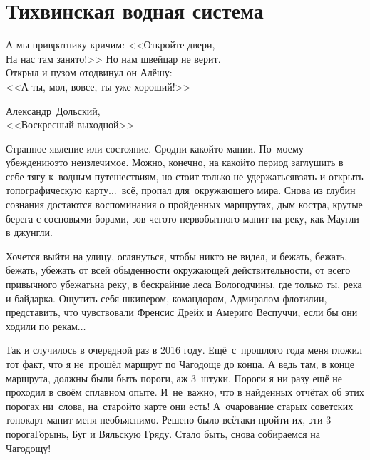 \chapter{Тихвинская водная система} 
\vspace{-9mm}
\vepsianrose

\setlength{\epigraphwidth}{0.75\textwidth}

\epigraph{%
	А мы привратнику кричим: <<Откройте двери,\\
	На нас там занято!>> Но нам швейцар не верит.\\
	Открыл и пузом отодвинул он Алёшу:\\
	<<А ты, мол, вовсе, ты уже хороший!>>}
	{
	\begin{flushright}
		\small{Александр~Дольский,\\<<Воскресный выходной>>}
	\end{flushright}
	}

Странное явление или состояние. Сродни какой\sdash то мании. По~моему убеждению\mdash это неизлечимое. Можно, конечно, на какой\sdash то период заглушить в себе тягу к~водным путешествиям, но стоит только не удержаться\mdash взять и открыть топографическую карту$\ldots$~всё, пропал для~окружающего мира. Снова из глубин сознания достаются воспоминания о пройденных маршрутах, дым костра, крутые берега с сосновыми борами, зов чего\sdash то первобытного манит на реку, как Маугли в джунгли. 

Хочется выйти на улицу, оглянуться, чтобы никто не видел, и бежать, бежать, бежать, убежать от всей обыденности окружающей действительности, от всего привычного убежать\mdash на реку, в бескрайние леса Вологодчины, где только ты, река и байдарка. Ощутить себя шкипером, командором, Адмиралом флотилии, представить, что чувствовали Френсис Дрейк и Америго Веспуччи, если бы они ходили по рекам$\ldots$ 

Так и случилось в очередной раз в 2016 году. Ещё~с~прошлого года меня гложил тот факт, что я не~прошёл маршрут по Чагодоще до конца. А ведь там, в конце маршрута, должны были быть пороги, аж 3~штуки. Пороги я ни разу ещё не проходил в своём сплавном опыте. И~не~важно, что в найденных отчётах об этих порогах ни~слова, на~старой\sdash то карте они есть! А~очарование старых советских топокарт манит меня необъяснимо. Решено было всё\sdash таки пройти их, эти 3 порога\mdash Горынь, Буг и Вяльскую Гряду. Стало быть, снова собираемся на Чагодощу!

